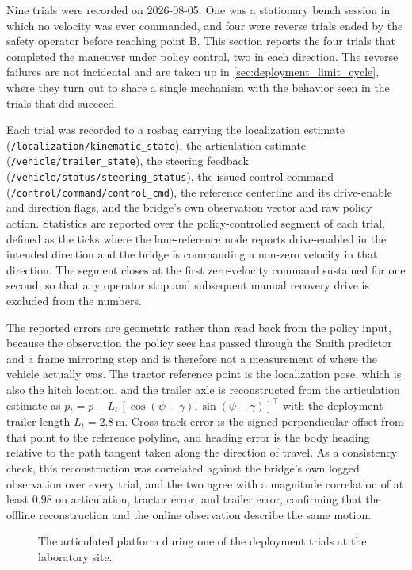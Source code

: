Nine trials were recorded on 2026-08-05. One was a stationary bench session in which no velocity was ever commanded, and four were reverse trials ended by the safety operator before reaching point B. This section reports the four trials that completed the maneuver under policy control, two in each direction. The reverse failures are not incidental and are taken up in \cref{sec:deployment_limit_cycle}, where they turn out to share a single mechanism with the behavior seen in the trials that did succeed.

Each trial was recorded to a rosbag carrying the localization estimate (\texttt{/localization/kinematic\_state}), the articulation estimate (\texttt{/vehicle/trailer\_state}), the steering feedback (\texttt{/vehicle/status/steering\_status}), the issued control command (\texttt{/control/command/control\_cmd}), the reference centerline and its drive-enable and direction flags, and the bridge's own observation vector and raw policy action. Statistics are reported over the policy-controlled segment of each trial, defined as the ticks where the lane-reference node reports drive-enabled in the intended direction and the bridge is commanding a non-zero velocity in that direction. The segment closes at the first zero-velocity command sustained for one second, so that any operator stop and subsequent manual recovery drive is excluded from the numbers.

The reported errors are geometric rather than read back from the policy input, because the observation the policy sees has passed through the Smith predictor and a frame mirroring step and is therefore not a measurement of where the vehicle actually was. The tractor reference point is the localization pose, which is also the hitch location, and the trailer axle is reconstructed from the articulation estimate as $p_t = p - L_t\,[\cos(\psi - \gamma), \sin(\psi - \gamma)]^\top$ with the deployment trailer length $L_t = 2.8$\,m. Cross-track error is the signed perpendicular offset from that point to the reference polyline, and heading error is the body heading relative to the path tangent taken along the direction of travel. As a consistency check, this reconstruction was correlated against the bridge's own logged observation over every trial, and the two agree with a magnitude correlation of at least $0.98$ on articulation, tractor error, and trailer error, confirming that the offline reconstruction and the online observation describe the same motion.

\begin{figure}[t]
  \centering
  \caption{The articulated platform during one of the deployment trials at the laboratory site.}
  \label{fig:deployment_trial}
\end{figure}

